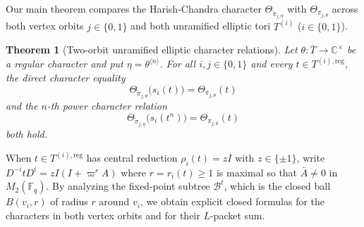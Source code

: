 \documentclass[12pt, letterpaper]{article}
\numberwithin{equation}{section}
\newtheorem{theorem}{Theorem}[section]
\theoremstyle{definition}
\theoremstyle{remark}
\newcommand{\kk}{\mathbb{F}_q}
\begin{document}
Our main theorem compares the Harish-Chandra character $\Theta_{\widetilde{\pi}_{j,\eta}}$ with $\Theta_{\pi_{j,\theta}}$ across both vertex orbits $j\in\{0,1\}$ and both unramified elliptic tori $T^{(i)}$ ($i\in\{0,1\}$).

\begin{theorem}[Two-orbit unramified elliptic character relations]\label{thm:main}
Let $\theta:\bar{T}\to\mathbb{C}^\times$ be a regular character and put $\eta=\theta^{\langle n\rangle}$. For all $i,j\in\{0,1\}$ and every $t\in T^{(i),\mathrm{reg}}$, the direct character equality
\begin{equation}\label{eq:direct-identity}
 \Theta_{\widetilde{\pi}_{j,\theta}}\bigl(s_i(t)\bigr)=\Theta_{\pi_{j,\theta}}(t)
\end{equation}
and the $n$-th power character relation
\begin{equation}\label{eq:main-identity}
 \Theta_{\widetilde{\pi}_{j,\eta}}\bigl(s_i(t^n)\bigr)=\Theta_{\pi_{j,\theta}}(t)
\end{equation}
both hold.
\end{theorem}

When $t\in T^{(i),\mathrm{reg}}$ has central reduction $\rho_i(t)=zI$ with $z\in\{\pm 1\}$, write $D^{-i}tD^i=zI(I+\varpi^r A)$ where $r=r_i(t)\ge 1$ is maximal so that $\bar{A}\ne 0$ in $M_2(\kk)$. By analyzing the fixed-point subtree $\mathscr{B}^t$, which is the closed ball $B(v_i,r)$ of radius $r$ around $v_i$, we obtain explicit closed formulas for the characters in both vertex orbits and for their $L$-packet sum.
\end{document}
